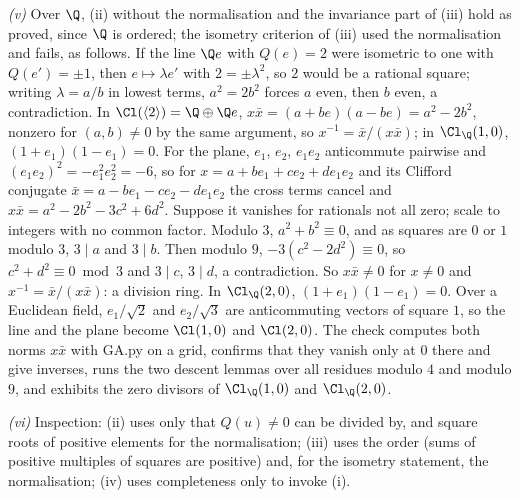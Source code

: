 \emph{(v)} Over $\Q$, (ii) without the normalisation and the invariance part of (iii) hold as proved, since $\Q$ is ordered; the isometry criterion of (iii) used the normalisation and fails, as follows. If the line $\Q e$ with $Q(e) = 2$ were isometric to one with $Q(e') = \pm 1$, then $e \mapsto \lambda e'$ with $2 = \pm\lambda^{2}$, so $2$ would be a rational square; writing $\lambda = a/b$ in lowest terms, $a^{2} = 2b^{2}$ forces $a$ even, then $b$ even, a contradiction. In $\Cl(\langle 2 \rangle) = \Q \oplus \Q e$, $x\bar{x} = (a + be)(a - be) = a^{2} - 2b^{2}$, nonzero for $(a, b) \ne 0$ by the same argument, so $x^{-1} = \bar{x}/(x\bar{x})$; in $\Cl_{\Q}(1,0)$, $(1 + e_{1})(1 - e_{1}) = 0$. For the plane, $e_{1}$, $e_{2}$, $e_{1}e_{2}$ anticommute pairwise and $(e_{1}e_{2})^{2} = -e_{1}^{2}e_{2}^{2} = -6$, so for $x = a + be_{1} + ce_{2} + de_{1}e_{2}$ and its Clifford conjugate $\bar{x} = a - be_{1} - ce_{2} - de_{1}e_{2}$ the cross terms cancel and $x\bar{x} = a^{2} - 2b^{2} - 3c^{2} + 6d^{2}$. Suppose it vanishes for rationals not all zero; scale to integers with no common factor. Modulo $3$, $a^{2} + b^{2} \equiv 0$, and as squares are $0$ or $1$ modulo $3$, $3 \mid a$ and $3 \mid b$. Then modulo $9$, $-3(c^{2} - 2d^{2}) \equiv 0$, so $c^{2} + d^{2} \equiv 0 \bmod 3$ and $3 \mid c$, $3 \mid d$, a contradiction. So $x\bar{x} \ne 0$ for $x \ne 0$ and $x^{-1} = \bar{x}/(x\bar{x})$: a division ring. In $\Cl_{\Q}(2,0)$, $(1 + e_{1})(1 - e_{1}) = 0$. Over a Euclidean field, $e_{1}/\sqrt{2}$ and $e_{2}/\sqrt{3}$ are anticommuting vectors of square $1$, so the line and the plane become $\Cl(1,0)$ and $\Cl(2,0)$. The check computes both norms $x\bar{x}$ with GA.py on a grid, confirms that they vanish only at $0$ there and give inverses, runs the two descent lemmas over all residues modulo $4$ and modulo $9$, and exhibits the zero divisors of $\Cl_{\Q}(1,0)$ and $\Cl_{\Q}(2,0)$.

\emph{(vi)} Inspection: (ii) uses only that $Q(u) \ne 0$ can be divided by, and square roots of positive elements for the normalisation; (iii) uses the order (sums of positive multiples of squares are positive) and, for the isometry statement, the normalisation; (iv) uses completeness only to invoke (i).
